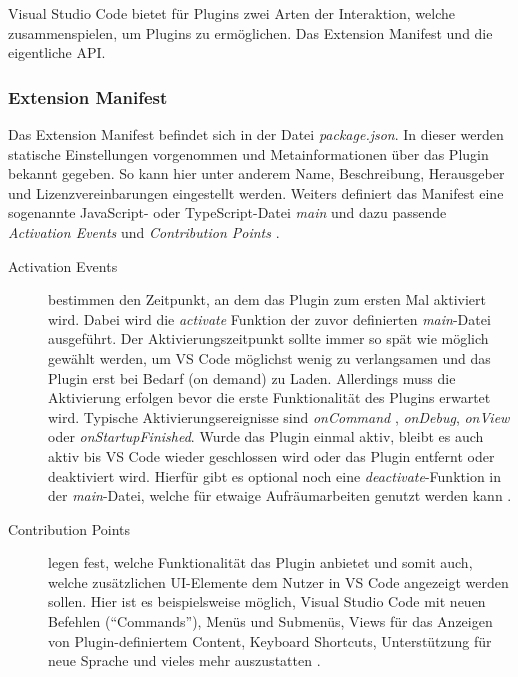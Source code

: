 Visual Studio Code bietet für Plugins zwei Arten der
Interaktion, welche zusammenspielen, um Plugins zu ermöglichen. 
Das Extension Manifest und die eigentliche API.
\subsubsection{Extension Manifest} 
  Das Extension Manifest befindet sich in der Datei \emph{package.json}.
  In dieser werden statische Einstellungen vorgenommen und
  Metainformationen über das Plugin bekannt gegeben. So kann hier unter
  anderem Name, Beschreibung, Herausgeber und Lizenzvereinbarungen
  eingestellt werden. Weiters definiert das Manifest eine sogenannte
  JavaScript- oder TypeScript-Datei \emph{main}  und dazu passende
  \emph{Activation Events} und \emph{Contribution Points}
  \cite{VSCodeExtensionAPIExtensionManifest,VSCodeExtensionAPIExtensionAnatomy}.
  \begin{description}
    \item[Activation Events] bestimmen den Zeitpunkt, an dem das Plugin zum ersten Mal
      aktiviert wird. Dabei wird die \emph{activate} Funktion der zuvor definierten
      \emph{main}-Datei ausgeführt. Der Aktivierungszeitpunkt sollte immer so spät wie
      möglich gewählt werden, um VS Code möglichst wenig zu verlangsamen und
      das Plugin erst bei Bedarf (on demand) zu Laden. Allerdings
      muss die Aktivierung erfolgen bevor die erste Funktionalität des
      Plugins erwartet wird. Typische Aktivierungsereignisse sind \emph{onCommand}
      , \emph{onDebug}, \emph{onView} oder \emph{onStartupFinished}.
      Wurde das Plugin einmal aktiv, bleibt es auch aktiv bis VS Code wieder geschlossen
      wird oder das Plugin entfernt oder deaktiviert wird. Hierfür gibt es optional
      noch eine \emph{deactivate}-Funktion in der \emph{main}-Datei, welche für etwaige
      Aufräumarbeiten genutzt werden kann
      \cite{VSCodeExtensionAPIActivationEvents,VSCodeExtensionAPIExtensionAnatomy}.
    \item[Contribution Points] legen fest, welche Funktionalität das Plugin anbietet
      und somit auch, welche zusätzlichen UI-Elemente
      dem Nutzer in VS Code angezeigt werden sollen.
      Hier ist es beispielsweise möglich, Visual Studio Code mit neuen Befehlen (\enquote{Commands}),
      Menüs und Submenüs, Views für das Anzeigen von Plugin-definiertem Content,
      Keyboard Shortcuts, Unterstützung für neue Sprache und vieles mehr auszustatten 
      \cite{VSCodeExtensionAPIContributionPoints}.
  \end{description}
